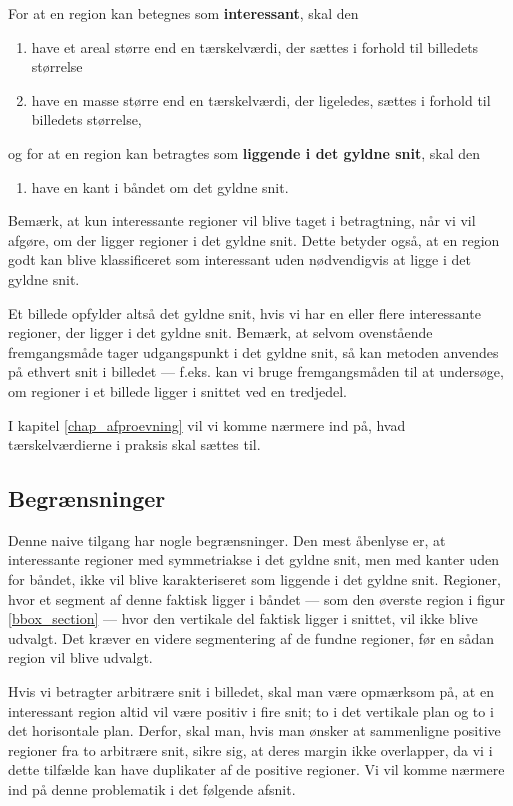 {\noindent For at en region kan betegnes som \textbf{interessant}, skal den
\begin{enumerate}
        \renewcommand{\labelenumi}{(\alph{enumi})}
    \item have et areal større end en tærskelværdi, der sættes i
        forhold til billedets størrelse
    \item have en masse større end en tærskelværdi, der ligeledes,
        sættes i forhold til billedets størrelse,
\end{enumerate}
og for at en region kan betragtes som \textbf{liggende i det gyldne
snit}, skal den
\begin{enumerate}
        \renewcommand{\labelenumi}{(\alph{enumi})}
        \setcounter{enumi}{2}
    \item have en kant i båndet om det gyldne snit.
\end{enumerate}

Bemærk, at kun interessante regioner vil blive taget i betragtning, når
vi vil afgøre, om der ligger regioner i det gyldne snit. Dette betyder
også, at en region godt kan blive klassificeret som interessant uden
nødvendigvis at ligge i det gyldne snit.

Et billede opfylder altså det gyldne snit, hvis vi har en eller flere
interessante regioner, der ligger i det gyldne snit. Bemærk, at selvom
ovenstående fremgangsmåde tager udgangspunkt i det gyldne snit, så kan
metoden anvendes på ethvert snit i billedet --- f.eks. kan vi bruge
fremgangsmåden til at undersøge, om regioner i et billede ligger i
snittet ved en tredjedel.

I kapitel \ref{chap_afproevning} vil vi komme nærmere ind på, hvad
tærskelværdierne i praksis skal sættes til.

\subsection{Begrænsninger}
Denne naive tilgang har nogle begrænsninger.  Den mest åbenlyse er, at
interessante regioner med symmetriakse i det gyldne snit, men med kanter uden for
båndet, ikke vil blive karakteriseret som liggende i det gyldne snit.
Regioner, hvor et segment af denne faktisk ligger i båndet --- som den
øverste region i figur \ref{bbox_section} --- hvor den vertikale del faktisk
ligger i snittet, vil ikke blive udvalgt.  Det kræver en videre
segmentering af de fundne regioner, før en sådan region vil blive
udvalgt.

Hvis vi betragter arbitrære snit i billedet, skal man være opmærksom på,
at en interessant region altid vil være positiv i fire snit; to i det
vertikale plan og to i det horisontale plan. Derfor, skal man, hvis man
ønsker at sammenligne positive regioner fra to arbitrære snit, sikre
sig, at deres margin ikke overlapper, da vi i dette tilfælde kan have
duplikater af de positive regioner. Vi vil komme nærmere ind på denne
problematik i det følgende afsnit.

}

